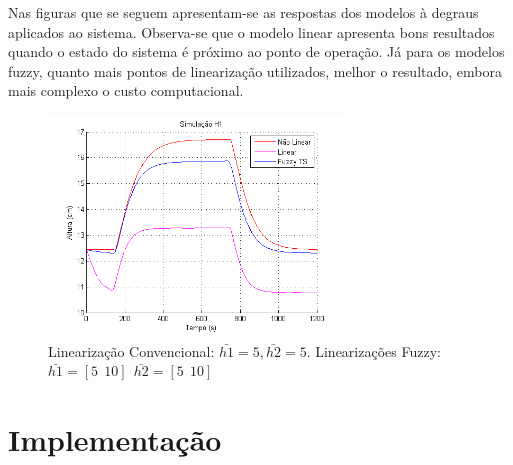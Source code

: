 Nas figuras que se seguem apresentam-se as respostas dos modelos à degraus aplicados ao sistema.  Observa-se que o modelo linear apresenta bons resultados quando o estado do sistema é próximo ao ponto de operação. Já para os modelos fuzzy, quanto mais pontos de linearização utilizados, melhor o resultado, embora mais complexo o custo computacional.

\begin{figure}[H]
	\centering
	\includegraphics[width=0.7\textwidth]{img/h1Fuz5_10.png}
	\caption{\small Linearização Convencional: $ \bar{h1}=5, \bar{h2}=5$. Linearizações Fuzzy: $\bar{h1}=[5 \ \ 10] \ \ \bar{h2}=[5 \ \ 10]$ }
	\label{figH1FNM_1}
\end{figure}


\section{Implementação}

%

